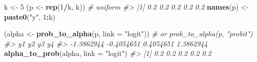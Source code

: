 \documentclass[
  man,floatsintext]{apa6}
\newenvironment{Shaded}{\begin{snugshade}}{\end{snugshade}}
\newcommand{\AttributeTok}[1]{\textcolor[rgb]{0.13,0.29,0.53}{#1}}
\newcommand{\CommentTok}[1]{\textcolor[rgb]{0.56,0.35,0.01}{\textit{#1}}}
\newcommand{\DecValTok}[1]{\textcolor[rgb]{0.00,0.00,0.81}{#1}}
\newcommand{\FunctionTok}[1]{\textcolor[rgb]{0.13,0.29,0.53}{\textbf{#1}}}
\newcommand{\NormalTok}[1]{#1}
\newcommand{\OtherTok}[1]{\textcolor[rgb]{0.56,0.35,0.01}{#1}}
\newcommand{\SpecialCharTok}[1]{\textcolor[rgb]{0.81,0.36,0.00}{\textbf{#1}}}
\newcommand{\StringTok}[1]{\textcolor[rgb]{0.31,0.60,0.02}{#1}}
\begin{document}
\scriptsize

\begin{Shaded}
\begin{Highlighting}[]
\NormalTok{k }\OtherTok{\textless{}{-}} \DecValTok{5}
\NormalTok{(p }\OtherTok{\textless{}{-}} \FunctionTok{rep}\NormalTok{(}\DecValTok{1}\SpecialCharTok{/}\NormalTok{k, k)) }\CommentTok{\# uniform}
\CommentTok{\#\textgreater{} [1] 0.2 0.2 0.2 0.2 0.2}
\FunctionTok{names}\NormalTok{(p) }\OtherTok{\textless{}{-}} \FunctionTok{paste0}\NormalTok{(}\StringTok{"y"}\NormalTok{, }\DecValTok{1}\SpecialCharTok{:}\NormalTok{k)}

\NormalTok{(alpha }\OtherTok{\textless{}{-}} \FunctionTok{prob\_to\_alpha}\NormalTok{(p, }\AttributeTok{link =} \StringTok{"logit"}\NormalTok{)) }\CommentTok{\# or prob\_to\_alpha(p, "probit")}
\CommentTok{\#\textgreater{}         y1         y2         y3         y4 }
\CommentTok{\#\textgreater{} {-}1.3862944 {-}0.4054651  0.4054651  1.3862944}
\FunctionTok{alpha\_to\_prob}\NormalTok{(alpha, }\AttributeTok{link =} \StringTok{"logit"}\NormalTok{)}
\CommentTok{\#\textgreater{} [1] 0.2 0.2 0.2 0.2 0.2}
\end{Highlighting}
\end{Shaded}

\normalsize

\scriptsize
\end{document}
